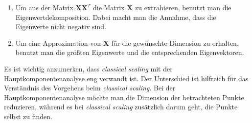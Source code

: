 \begin{enumerate}
\begin{align*}
\right).
\end{align*}
Wichtige Spezialfälle sind: 
\begin{itemize}
 \item Zentrierung eines Vektors, der nur Einsen enthält und
 \item Zentrierung  eines bereits zentrierten Vektors.
\end{itemize}
Im ersten Fall erhält man den Nullvektor, weil der Mittelwert eines Vektors nur mit Einsen immer den Wert 1 hat. Im zweiten Fall bewirkt die Zentrierung nichts, da der 
Vektor bereits zentriert ist. Multipliziert man $\mathbf{\Delta}^{(2)}$ beidseitig mit $\mathbf{C}_n$, ergibt sich:
\begin{align*}
 \mathbf{C}_n\mathbf{\Delta}^{(2)}\mathbf{C}_n &= \mathbf{C}_n\left(\mathbf{c}\mathbf{1}^T + \mathbf{1}\mathbf{c}^T - 2\mathbf{X}\mathbf{X^T} \right)\mathbf{C}_n \\
                                               &= \mathbf{C}_n\mathbf{c}\mathbf{1}^T\mathbf{C}_n + \mathbf{C}_n\mathbf{1}\mathbf{c}^T\mathbf{C}_n - 2\mathbf{C}_n\mathbf{X}\mathbf{X^T}\mathbf{C}_n \\
                                               &= \mathbf{C}_n\mathbf{c}\mathbf{0}^T + \mathbf{0}\mathbf{c}^T\mathbf{C}_n - 2\mathbf{C}_n\mathbf{X}\mathbf{X^T}\mathbf{C}_n \\
                                               &=   \underbrace{- 2\mathbf{C}_n\mathbf{X}\mathbf{X^T}\mathbf{C}_n}_{\text{X ist zentriert}} \\
                                               &= -2 \mathbf{X}\mathbf{X^T}.
\end{align*}
Im letzten Schritt der Rechnung nimmt man an, dass die Matrix $\mathbf{X}$ zentriert ist. Das ist keine Einschränkung, weil man eine beliebige Lösung sucht. Außerdem
lässt sich die Lösung durch eine Translation anpassen, sodass die Distanzen zwischen den Punkten unverändert bleiben.

\item Um aus der Matrix $\mathbf{X}\mathbf{X}^T$ die Matrix $\mathbf{X}$ zu extrahieren, benutzt man die Eigenwertdekomposition. Dabei macht man die Annahme, dass 
die Eigenwerte nicht negativ sind.
\item Um eine Approximation von $\mathbf{X}$ für die gewünschte Dimension zu erhalten, benutzt man die größten Eigenwerte und die entsprechenden Eigenvektoren.
\end{enumerate}


Es ist wichtig anzumerken, dass \textit{classical scaling} mit der Hauptkomponentenanalyse
\cite{jolliffe2002principal} eng verwandt ist. Der Unterschied ist hilfreich für das Verständnis des Vorgehens beim \textit{classical scaling}. Bei
der Hauptkomponentenanalyse möchte man die Dimension der betrachteten Punkte reduzieren, während es bei \textit{classical scaling} zusätzlich
darum geht, die Punkte selbst zu finden.

